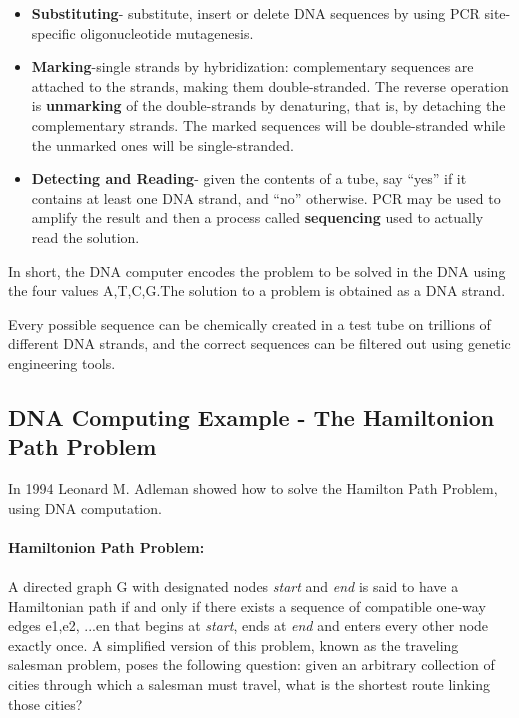 \documentclass[a4paper]{article}
\begin{document}
\begin{itemize}
        \item \textbf{Substituting}- substitute,  insert  or  delete  DNA  sequences  by  using PCR site-specific oligonucleotide mutagenesis.
        \item \textbf{Marking}-single strands by hybridization: complementary sequences are  attached  to  the  strands,  making  them  double-stranded.  The reverse    operation    is \textbf{unmarking} of    the    double-strands    by denaturing,  that  is,  by  detaching  the  complementary  strands.  The marked sequences will be double-stranded while the unmarked ones will be single-stranded.
        \item \textbf{Detecting and Reading}- given the contents of a tube, say ``yes'' if it contains at least one DNA strand, and ``no'' otherwise. PCR may be used  to  amplify  the  result  and  then  a  process  called \textbf{sequencing} used to actually read the solution. 
  \end{itemize}
    
    In short, the DNA computer encodes the problem to be solved in the DNA using the four values A,T,C,G.The solution to a problem is obtained as a DNA strand.
    
    Every  possible  sequence  can  be  chemically  created  in  a  test  tube  on trillions  of different  DNA strands,  and  the  correct  sequences  can  be filtered out using genetic engineering tools.
    
\subsection{DNA Computing Example - The Hamiltonion Path Problem}

In  1994  Leonard  M.  Adleman showed  how  to  solve  the  Hamilton  Path Problem, using DNA computation.
\\ \\
\textbf{Hamiltonion Path Problem:}
\\ \\

A directed graph G with designated nodes \textit{start} and \textit{end} is said to have a Hamiltonian  path  if  and  only  if  there  exists  a  sequence  of  compatible one-way  edges e1,e2,  ...en that  begins  at \textit{start},  ends  at \textit{end} and  enters every  other  node  exactly  once.  A  simplified  version  of  this  problem, known  as  the  traveling  salesman  problem,  poses  the  following  question: given  an  arbitrary  collection  of  cities  through  which  a  salesman  must travel, what is the shortest route linking those cities?
\end{document}
